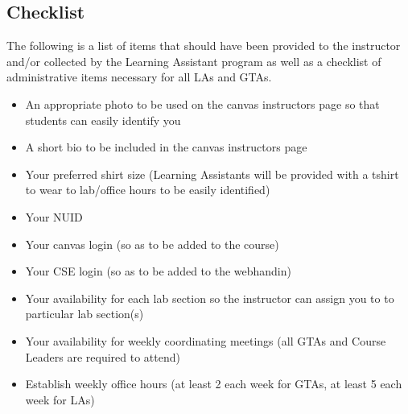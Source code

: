 \documentclass[12pt]{scrartcl}
\begin{document}
\subsection*{Checklist}

The following is a list of items that should have been provided to 
the instructor and/or collected by the Learning Assistant program
as well as a checklist of administrative items necessary for all
LAs and GTAs.

\begin{itemize}
  \item An appropriate photo to be used on the canvas instructors 
    page so that students can easily identify you
  \item A short bio to be included in the canvas instructors page 
  \item Your preferred shirt size (Learning Assistants will be provided
  with a tshirt to wear to lab/office hours to be easily identified)
  \item Your NUID
  \item Your canvas login (so as to be added to the course)
  \item Your CSE login (so as to be added to the webhandin)
  \item Your availability for each lab section so the instructor can 
    assign you to to particular lab section(s) 
  \item Your availability for weekly coordinating meetings (all GTAs 
    and Course Leaders are required to attend)
  \item Establish weekly office hours (at least 2 each week for 
    GTAs, at least 5 each week for LAs)
\end{itemize}
\end{document}
